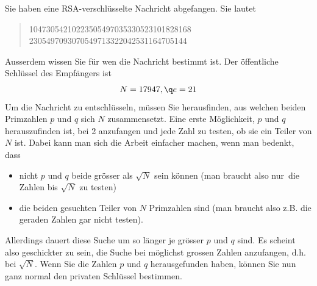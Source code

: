 \documentclass[%
<<<<<<< Updated upstream
11pt,%
twoside,%
titlepage,%
german,%
headsepline%
]{scrartcl}
\begin{document}
\begin{cdef}[Linksverschiebung]{}
\begin{cdef}{}
\begin{bsp}
Sie haben eine RSA-verschlüsselte Nachricht abgefangen. Sie lautet
\begin{quote}
10473054210223505497035330523101828168\\
2305497093070549713322042531164705144
\end{quote}
Ausserdem wissen Sie für wen die Nachricht bestimmt ist. Der \"offentliche Schlüssel des Empfängers ist
$$N=17947,\q e=21$$
Um die Nachricht zu entschlüsseln, müssen Sie herausfinden, aus welchen beiden Primzahlen $p$ und $q$ sich $N$ zusammensetzt.
Eine erste Möglichkeit, $p$ und $q$ herauszufinden ist, bei 2 anzufangen und jede Zahl zu testen, ob sie ein Teiler von $N$ ist. Dabei kann man sich die Arbeit einfacher machen, wenn man bedenkt, dass
\begin{itemize}
\item nicht $p$ und $q$ beide gr\"osser als $\sqrt{N}$ sein k\"onnen (man braucht also \glqq nur\grqq\ die Zahlen bis $\sqrt{N}$ zu testen)
\item die beiden gesuchten Teiler von $N$ Primzahlen sind (man braucht also z.B. die geraden Zahlen gar nicht testen).
\end{itemize}
Allerdings dauert diese Suche um so länger je grösser $p$ und $q$  sind. Es scheint also geschickter zu sein, die Suche bei möglichst grossen Zahlen anzufangen, d.h. bei $\sqrt{N}$.
Wenn Sie die Zahlen $p$ und $q$ herausgefunden haben, k\"onnen Sie nun ganz normal den privaten Schlüssel  bestimmen.
\end{bsp}


\end{cdef}
\end{cdef}
\end{document}
